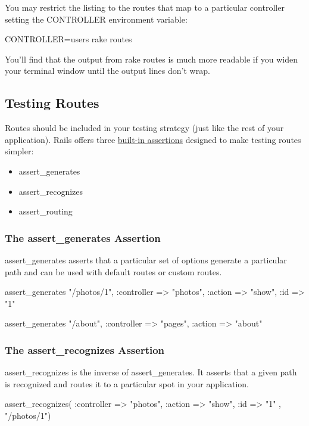 \documentclass[10pt]{book}
\newenvironment{code}{%
  \scriptsize
    \verbatim
}{%
    \endverbatim
    \newline
}
\begin{document}
You may restrict the listing to the routes that map to a particular controller setting the CONTROLLER environment variable:
\begin{code}
CONTROLLER=users rake routes
\end{code}

You’ll find that the output from rake routes is much more readable if you widen your terminal window until the output lines don’t wrap.

\subsection{ Testing Routes}

Routes should be included in your testing strategy (just like the rest of your application). Rails offers three \href{http://api.rubyonrails.org/classes/ActionDispatch/Assertions/RoutingAssertions.html}{built-in assertions} designed to make testing routes simpler:
\begin{itemize}
	\item assert\_generates
	\item assert\_recognizes
	\item assert\_routing
\end{itemize}

\subsubsection{ The assert\_generates Assertion}

assert\_generates asserts that a particular set of options generate a particular path and can be used with default routes or custom routes.
{\scriptsize
\begin{code}
assert_generates "/photos/1", 
{ :controller => "photos", :action => "show", :id => "1" }

assert_generates "/about", 
:controller => "pages", :action => "about"
\end{code}
}
\subsubsection{ The assert\_recognizes Assertion}

assert\_recognizes is the inverse of assert\_generates. It asserts that a given path is recognized and routes it to a particular spot in your application.
{\scriptsize
\begin{code}
assert_recognizes({ :controller => "photos", 
      :action => "show", :id => "1" }, "/photos/1")
\end{code}
}
\end{document}
